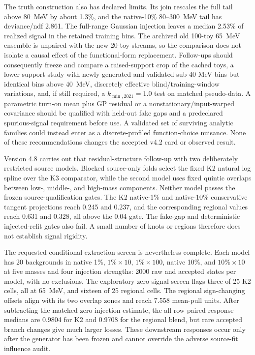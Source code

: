 The truth construction also has declared limits.  Its join rescales the full
tail above 80~MeV by about 1.3\%, and the native-10\% 80--300~MeV tail has
deviance/ndf 2.861.  The full-range Gaussian injection leaves a median 2.53\%
of realized signal in the retained training bins.  The archived old 100-toy
65~MeV ensemble is unpaired with the new 20-toy streams, so the comparison does
not isolate a causal effect of the functional-form replacement.  Follow-ups
should consequently freeze and compare a raised-support crop of the cached
toys, a lower-support study with newly generated and validated sub-40-MeV bins
but identical bins above 40~MeV, discretely effective blind/training-window
variations, and, if still required, a $k_{\min,2021}=1.0$ test on matched
pseudo-data.  A parametric turn-on mean plus GP residual or a
nonstationary/input-warped covariance should be qualified with held-out fake
gaps and a predeclared spurious-signal requirement before use.  A validated
set of surviving analytic families could instead enter as a discrete-profiled
function-choice nuisance.  None of these recommendations changes the accepted
v4.2 card or observed result.

Version 4.8 carries out that residual-structure follow-up with two deliberately
restricted source models.  Blocked source-only folds select the fixed K2
natural log spline over the K3 comparator, while the second model uses fixed
quintic overlaps between low-, middle-, and high-mass components.  Neither
model passes the frozen source-qualification gates.  The K2 native-1\% and
native-10\% conservative tangent projections reach 0.245 and 0.237, and the
corresponding regional values reach 0.631 and 0.328, all above the 0.04 gate.
The fake-gap and deterministic injected-refit gates also fail.  A small number
of knots or regions therefore does not establish signal rigidity.

The requested conditional extraction screen is nevertheless complete.  Each
model has 20 backgrounds in native 1\%, $1\%\times10$, $1\%\times100$,
native 10\%, and $10\%\times10$ at five masses and four injection strengths:
2000 raw and accepted states per model, with no exclusions.  The exploratory
zero-signal screen flags three of 25 K2 cells, all at 65~MeV, and sixteen of 25
regional cells.  The regional sign-changing offsets align with its two overlap
zones and reach 7.558 mean-pull units.  After subtracting the matched
zero-injection estimate, the all-row paired-response medians are 0.9804 for K2
and 0.9708 for the regional blend, but rare accepted branch changes give much
larger losses.  These downstream responses occur only after the generator has
been frozen and cannot override the adverse source-fit influence audit.

